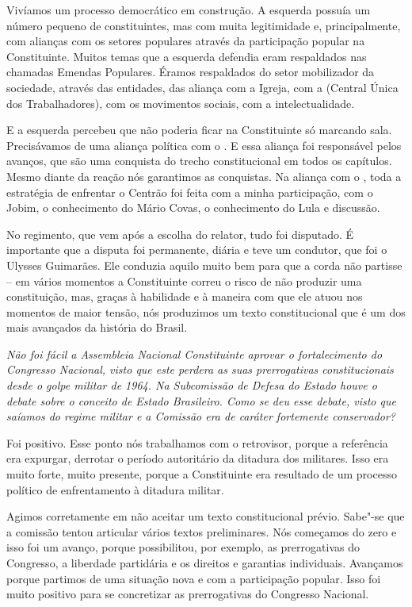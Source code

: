 Vivíamos um processo democrático em construção. A
esquerda possuía um número pequeno de constituintes, mas com muita
legitimidade e, principalmente, com alianças com os setores populares
através da participação popular na Constituinte. Muitos temas que a
esquerda defendia eram respaldados nas chamadas Emendas Populares.
Éramos respaldados do setor mobilizador da sociedade, através das
entidades, das aliança com a Igreja, com a  (Central Única dos
Trabalhadores), com os movimentos sociais, com a intelectualidade.

E a esquerda percebeu que não poderia ficar na Constituinte só marcando
sala. Precisávamos de uma aliança política com o . E essa aliança
foi responsável pelos avanços, que são uma conquista do trecho
constitucional em todos os capítulos. Mesmo diante da reação nós
garantimos as conquistas. Na aliança com o , toda a estratégia de
enfrentar o Centrão foi feita com a minha participação, com o Jobim, o
conhecimento do Mário Covas, o conhecimento do Lula e discussão.

No regimento, que vem após a escolha do relator, tudo foi disputado. É
importante que a disputa foi permanente, diária e teve um condutor,
que foi o Ulysses Guimarães. Ele conduzia aquilo muito bem para que a
corda não partisse -- em vários momentos a Constituinte correu o risco
de não produzir uma constituição, mas, graças à habilidade e à maneira
com que ele atuou nos momentos de maior tensão, nós produzimos um texto
constitucional que é um dos mais avançados da história do Brasil.

\medskip

\noindent\emph{Não foi fácil a Assembleia Nacional Constituinte aprovar o
fortalecimento do Congresso Nacional, visto que este perdera as suas
prerrogativas constitucionais desde o golpe militar de 1964. Na
Subcomissão de Defesa do Estado houve o debate sobre o conceito de
Estado Brasileiro. Como se deu esse debate, visto que saíamos do regime
militar e a Comissão era de caráter fortemente conservador?}

Foi positivo. Esse ponto nós trabalhamos com o
retrovisor, porque a referência era expurgar, derrotar o período
autoritário da ditadura dos militares. Isso era muito forte, muito
presente, porque a Constituinte era resultado de um processo político de
enfrentamento à ditadura militar.

Agimos corretamente em não aceitar um texto constitucional prévio.
Sabe"-se que a comissão tentou articular vários textos preliminares. Nós
começamos do zero e isso foi um avanço, porque possibilitou, por
exemplo, as prerrogativas do Congresso, a liberdade partidária e os
direitos e garantias individuais. Avançamos porque partimos de uma
situação nova e com a participação popular. Isso foi muito positivo para
se concretizar as prerrogativas do Congresso Nacional.

